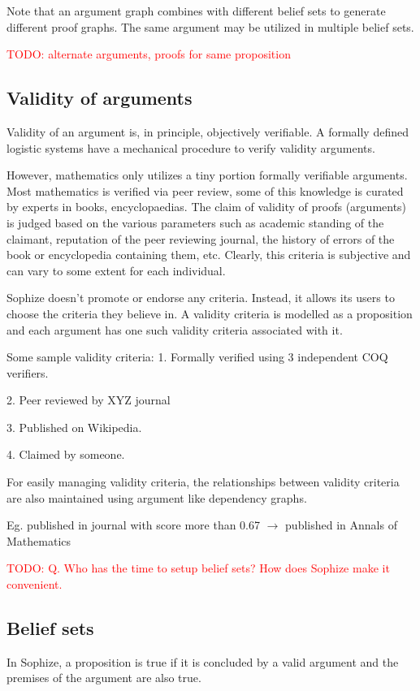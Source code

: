 \documentclass[a4paper]{article}
\newcommand\todo[1]{\textcolor{red}{TODO: #1}}
\begin{document}
Note that an argument graph combines with different belief sets to generate different proof graphs. The same argument may be utilized in multiple belief sets.

\todo{alternate arguments, proofs for same proposition}

\subsection{Validity of arguments}
Validity of an argument is, in principle, objectively verifiable. A formally defined logistic systems have a mechanical procedure to verify validity arguments.

However, mathematics only utilizes a tiny portion formally verifiable arguments. Most mathematics is verified via peer review, some of this knowledge is curated by experts in books, encyclopaedias. The claim of validity of proofs (arguments) is judged based on the various parameters such as academic standing of the claimant, reputation of the peer reviewing journal, the history of errors of the book or encyclopedia containing them, etc. Clearly, this criteria is subjective and can vary to some extent for each individual.

Sophize doesn't promote or endorse any criteria. Instead, it allows its users to choose the criteria they believe in. A validity criteria is modelled as a proposition and each argument has one such validity criteria associated with it.

Some sample validity criteria:
1. Formally verified using 3 independent COQ verifiers.

2. Peer reviewed by XYZ journal

3. Published on Wikipedia.

4. Claimed by someone.

For easily managing validity criteria, the relationships between validity criteria are also maintained using argument like dependency graphs.

Eg. published in journal with score more than 0.67 $\rightarrow$ published in Annals of Mathematics


\todo{Q. Who has the time to setup belief sets? How does Sophize make it 
convenient.}


\subsection{Belief sets}

In Sophize, a proposition is true if it is concluded by a valid argument and the premises of the argument are also true.
\end{document}
